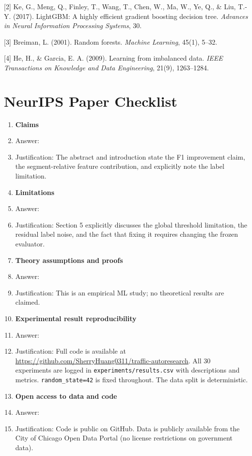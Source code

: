 \documentclass{article}
\begin{document}
[2] Ke, G., Meng, Q., Finley, T., Wang, T., Chen, W., Ma, W., Ye, Q., \& Liu, T.-Y. (2017).
LightGBM: A highly efficient gradient boosting decision tree.
\textit{Advances in Neural Information Processing Systems}, 30.

[3] Breiman, L. (2001). Random forests.
\textit{Machine Learning}, 45(1), 5--32.

[4] He, H., \& Garcia, E. A. (2009). Learning from imbalanced data.
\textit{IEEE Transactions on Knowledge and Data Engineering}, 21(9), 1263--1284.

\newpage
\section*{NeurIPS Paper Checklist}

\begin{enumerate}

\item {\bf Claims}
    \item[] Answer: \answerYes{}
    \item[] Justification: The abstract and introduction state the F1 improvement claim,
    the segment-relative feature contribution, and explicitly note the label limitation.

\item {\bf Limitations}
    \item[] Answer: \answerYes{}
    \item[] Justification: Section 5 explicitly discusses the global threshold limitation,
    the residual label noise, and the fact that fixing it requires changing the frozen evaluator.

\item {\bf Theory assumptions and proofs}
    \item[] Answer: \answerNA{}
    \item[] Justification: This is an empirical ML study; no theoretical results are claimed.

\item {\bf Experimental result reproducibility}
    \item[] Answer: \answerYes{}
    \item[] Justification: Full code is available at
    \url{https://github.com/SherryHuang0311/traffic-autoresearch}. All 30 experiments
    are logged in \texttt{experiments/results.csv} with descriptions and metrics.
    \texttt{random\_state=42} is fixed throughout. The data split is deterministic.

\item {\bf Open access to data and code}
    \item[] Answer: \answerYes{}
    \item[] Justification: Code is public on GitHub. Data is publicly available from
    the City of Chicago Open Data Portal (no license restrictions on government data).


\end{enumerate}
\end{document}
